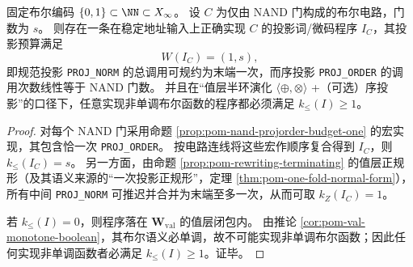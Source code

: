 \begin{theorem}[布尔电路的投影预算编译]\label{thm:pom-boolean-circuit-projection-budget}
固定布尔编码 \(\{0,1\}\subset\NN\subset X_\infty\)。
设 \(C\) 为仅由 \(\mathrm{NAND}\) 门构成的布尔电路，门数为 \(s\)。
则存在一条在稳定地址输入上正确实现 \(C\) 的投影词/微码程序 \(I_C\)，其投影预算满足
\[
W(I_C)=(1,s),
\]
即规范投影 \texttt{PROJ\_NORM} 的总调用可规约为末端一次，而序投影 \texttt{PROJ\_ORDER} 的调用次数线性等于 \(\mathrm{NAND}\) 门数。
并且在“值层半环演化 \(\langle\oplus,\otimes\rangle\) +（可选）序投影”的口径下，任意实现非单调布尔函数的程序都必须满足 \(k_{\le}(I)\ge 1\)。
\end{theorem}
\begin{proof}
对每个 \(\mathrm{NAND}\) 门采用命题 \ref{prop:pom-nand-projorder-budget-one} 的宏实现，其包含恰一次 \texttt{PROJ\_ORDER}。
按电路连线将这些宏作顺序复合得到 \(I_C\)，则 \(k_{\le}(I_C)=s\)。
另一方面，由命题 \ref{prop:pom-rewriting-terminating} 的值层正规形（及其语义来源的“一次投影正规形”，定理 \ref{thm:pom-one-fold-normal-form}），所有中间 \texttt{PROJ\_NORM} 可推迟并合并为末端至多一次，从而可取 \(k_Z(I_C)=1\)。
\par
若 \(k_{\le}(I)=0\)，则程序落在 \(\mathbf{W}_{\mathrm{val}}\) 的值层闭包内。
由推论 \ref{cor:pom-val-monotone-boolean}，其布尔语义必单调，故不可能实现非单调布尔函数；因此任何实现非单调函数者必满足 \(k_{\le}(I)\ge 1\)。证毕。
\end{proof}
